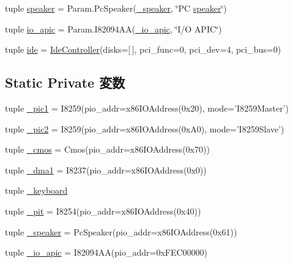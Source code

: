 \begin{DoxyCompactItemize}
\item 
tuple \hyperlink{classSouthBridge_1_1SouthBridge_a05a57a2974f0aeff7ea53b64039e080a}{speaker} = Param.PcSpeaker(\hyperlink{classSouthBridge_1_1SouthBridge_a27a2224d5923719babfd130a76f9e10c}{\_\-speaker}, \char`\"{}PC \hyperlink{classSouthBridge_1_1SouthBridge_a05a57a2974f0aeff7ea53b64039e080a}{speaker}\char`\"{})
\item 
tuple \hyperlink{classSouthBridge_1_1SouthBridge_ac5ef71008cf8b7c11d6c4cc8fe421e2b}{io\_\-apic} = Param.I82094AA(\hyperlink{classSouthBridge_1_1SouthBridge_a0a1cf684838dd7ce54be3f113b981db4}{\_\-io\_\-apic}, \char`\"{}I/O APIC\char`\"{})
\item 
tuple \hyperlink{classSouthBridge_1_1SouthBridge_aca6e0ef87c4d6a0425503849acb9d173}{ide} = \hyperlink{classIdeController}{IdeController}(disks=\mbox{[}$\,$\mbox{]}, pci\_\-func=0, pci\_\-dev=4, pci\_\-bus=0)
\end{DoxyCompactItemize}
\subsection*{Static Private 変数}
\begin{DoxyCompactItemize}
\item 
tuple \hyperlink{classSouthBridge_1_1SouthBridge_a2a9738033aae844627554246f92f6e3b}{\_\-pic1} = I8259(pio\_\-addr=x86IOAddress(0x20), mode='I8259Master')
\item 
tuple \hyperlink{classSouthBridge_1_1SouthBridge_abaad4b42924c6da51b3284d582a140bb}{\_\-pic2} = I8259(pio\_\-addr=x86IOAddress(0xA0), mode='I8259Slave')
\item 
tuple \hyperlink{classSouthBridge_1_1SouthBridge_abc6e236abbfb15f376d3e6779638bdde}{\_\-cmos} = Cmos(pio\_\-addr=x86IOAddress(0x70))
\item 
tuple \hyperlink{classSouthBridge_1_1SouthBridge_ab222e5bd18f00cb090a1b0efdcd86d0c}{\_\-dma1} = I8237(pio\_\-addr=x86IOAddress(0x0))
\item 
tuple \hyperlink{classSouthBridge_1_1SouthBridge_a9fc8cd80d0fc4c822b4d8ad51fd1d49c}{\_\-keyboard}
\item 
tuple \hyperlink{classSouthBridge_1_1SouthBridge_a0298229d3025c8eb875998bb9160c43d}{\_\-pit} = I8254(pio\_\-addr=x86IOAddress(0x40))
\item 
tuple \hyperlink{classSouthBridge_1_1SouthBridge_a27a2224d5923719babfd130a76f9e10c}{\_\-speaker} = PcSpeaker(pio\_\-addr=x86IOAddress(0x61))
\item 
tuple \hyperlink{classSouthBridge_1_1SouthBridge_a0a1cf684838dd7ce54be3f113b981db4}{\_\-io\_\-apic} = I82094AA(pio\_\-addr=0xFEC00000)
\end{DoxyCompactItemize}


